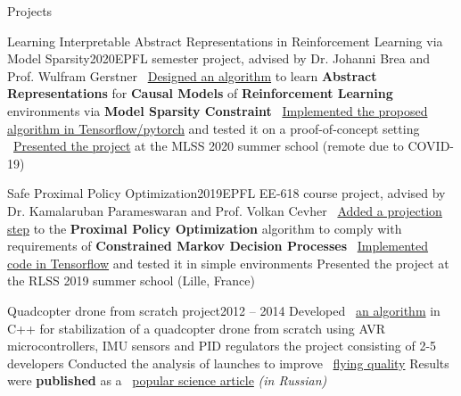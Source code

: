 \documentclass{resume} %
\newcommand{\mylink}{{\color{gray}\faExternalLink}}
\begin{document}
\begin{rSection}{Projects}
		\begin{rSubsection}{Learning Interpretable Abstract Representations in Reinforcement Learning via Model Sparsity}{2020}{EPFL semester project, advised by Dr. Johanni Brea and Prof. Wulfram Gerstner}{}
		\myitem \mylink~\href{https://www.overleaf.com/read/nqgjrjbcybrp}{Designed an algorithm} to learn {\bf Abstract Representations} for {\bf Causal Models} of {\bf Reinforcement Learning} environments via {\bf Model Sparsity Constraint}
		\myitem \mylink~\href{https://github.com/sergeivolodin/causality-disentanglement-rl}{Implemented the proposed algorithm in Tensorflow/pytorch} and tested it on a proof-of-concept setting
		\myitem \mylink~\href{https://www.youtube.com/watch?v=4cO4XU15isQ}{Presented the project} at the MLSS 2020 summer school (remote due to COVID-19)
	\end{rSubsection}
	
	\begin{rSubsection}{Safe Proximal Policy Optimization}{2019}{EPFL EE-618 course project, advised by Dr. Kamalaruban Parameswaran and Prof. Volkan Cevher}{}
		\myitem \mylink~\href{https://www.overleaf.com/read/cvxkswbspgpb}{Added a projection step} to the {\bf Proximal Policy Optimization} algorithm to comply with requirements of {\bf Constrained Markov Decision Processes}
		\myitem \mylink~\href{https://github.com/sergeivolodin/SafeContinuousStateRL}{Implemented code in Tensorflow} and tested it in simple environments
		\myitem Presented the project at the RLSS 2019 summer school (Lille, France)
	\end{rSubsection}
	
	\begin{rSubsection}{Quadcopter drone from scratch project}{2012 -- 2014}{}{}
		\myitem Developed \mylink~\href{https://github.com/it-workshop/Quadrocopter}{an algorithm} in C++ for stabilization of a quadcopter drone from scratch using AVR microcontrollers, IMU sensors and PID regulators
		 the project consisting of 2-5 developers
		\myitem Conducted the analysis of launches to improve \mylink~\href{https://www.youtube.com/watch?v=AxDoO-gNRtc}{flying quality}
		\myitem Results were {\bf published} as a \mylink~\href{http://web.archive.org/web/20141016114551/http://habrahabr.ru/company/technoworks/blog/216437/}{popular science article} {\em (in Russian)}
	\end{rSubsection}
\end{rSection}
\end{document}
